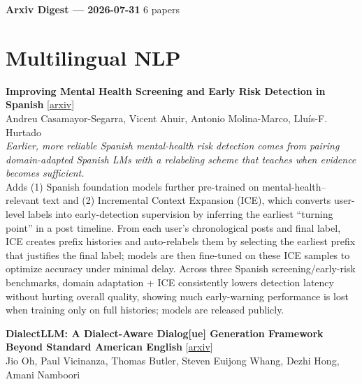 \documentclass[12pt,letterpaper]{article}
\begin{document}
{\footnotesize\textbf{Arxiv Digest --- 2026-07-31} \hfill 6 papers}

\smallskip

\section*{Multilingual NLP}

{\small\textbf{Improving Mental Health Screening and Early Risk Detection in Spanish}} {\scriptsize[\href{https://arxiv.org/abs/2607.28476}{arxiv}]}\\
{\scriptsize Andreu Casamayor-Segarra, Vicent Ahuir, Antonio Molina-Marco, Llu\'is-F. Hurtado}\\

{\small\textit{Earlier, more reliable Spanish mental-health risk detection comes from pairing domain-adapted Spanish LMs with a relabeling scheme that teaches when evidence becomes sufficient.}}\\[1pt]
{\footnotesize Adds (1) Spanish foundation models further pre-trained on mental-health--relevant text and (2) Incremental Context Expansion (ICE), which converts user-level labels into early-detection supervision by inferring the earliest ``turning point'' in a post timeline. From each user's chronological posts and final label, ICE creates prefix histories and auto-relabels them by selecting the earliest prefix that justifies the final label; models are then fine-tuned on these ICE samples to optimize accuracy under minimal delay. Across three Spanish screening/early-risk benchmarks, domain adaptation + ICE consistently lowers detection latency without hurting overall quality, showing much early-warning performance is lost when training only on full histories; models are released publicly.}

\medskip

{\small\textbf{DialectLLM: A Dialect-Aware Dialog[ue] Generation Framework Beyond Standard American English}} {\scriptsize[\href{https://arxiv.org/abs/2601.22888}{arxiv}]}\\
{\scriptsize Jio Oh, Paul Vicinanza, Thomas Butler, Steven Euijong Whang, Dezhi Hong, Amani Namboori}\\
\end{document}
